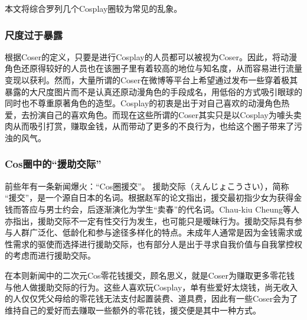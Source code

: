 \documentclass[a4paper]{article}
\begin{document}
	本文将综合罗列几个Cosplay圈较为常见的乱象。
	\subsubsection{尺度过于暴露}
	根据Coser的定义，只要是进行Cosplay的人员都可以被视为Coser。因此，将动漫角色还原得较好的人员也在该圈子里有着较高的地位与知名度，从而容易进行流量变现以获利。然而，大量所谓的Coser在微博等平台上希望通过发布一些穿着极其暴露的大尺度图片而不是认真还原动漫角色的手段成名，用低俗的方式吸引眼球的同时也不尊重原著角色的造型。Cosplay的初衷是出于对自己喜欢的动漫角色热爱，去扮演自己的喜欢角色。而现在这些所谓的Coser其实只是以Cosplay为噱头卖肉从而吸引打赏，赚取金钱，从而带动了更多的不良行为，也给这个圈子带来了污浊的风气。
	
	\subsubsection{Cos圈中的“援助交际”}
	前些年有一条新闻爆火：“Cos圈援交”\cite{ref1}。 援助交际（えんじょこうさい），简称 “援交”，是一个源自日本的名词。根据赵军的论文指出\cite{ref2}，援交最初指少女为获得金钱而答应与男士约会，后逐渐演化为学生“卖春”的代名词。Chau-kiu Cheung等人亦指出\cite{ref3}，援助交际不一定有性交行为发生，也可能只是暧昧行为。援助交际具有参与人群广泛化、低龄化和参与途径多样化的特点。未成年人通常是因为金钱需求或性需求的驱使而选择进行援助交际，也有部分人是出于寻求自我价值与自我掌控权的考虑而进行援助交际。
	
	在本则新闻中的二次元Cos零花钱援交，顾名思义，就是Coser为赚取更多零花钱与他人做援助交际的行为。这些人喜欢玩Cosplay，单有些爱好太烧钱，尚无收入的人仅仅凭父母给的零花钱无法支付起置装费、道具费，因此有一些Coser会为了维持自己的爱好而去赚取一些额外的零花钱，援交便是其中一种方式。\\
	
\end{document}
